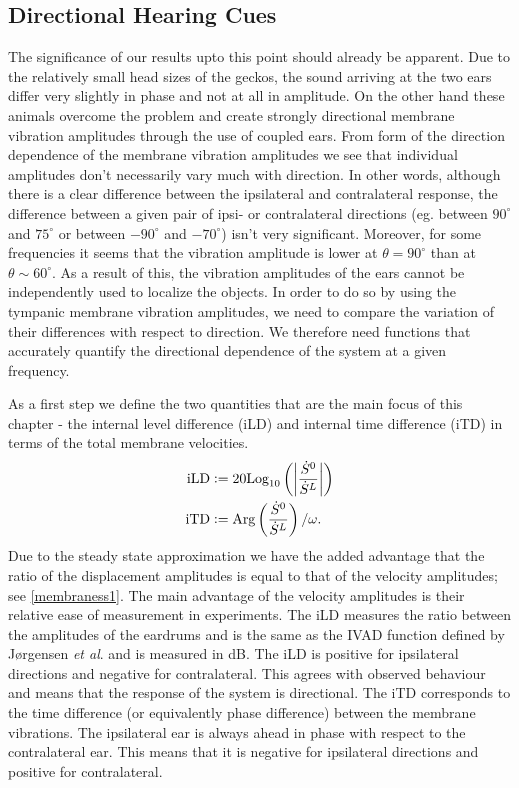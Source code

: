\subsection{Directional Hearing Cues}\label{hearingcuessection}
The significance of our results upto this point should
already be apparent. Due to the relatively small head sizes of the geckos, the sound arriving at the two ears differ very slightly in phase and not at all in amplitude. On the other hand
 these animals overcome the problem and create strongly directional membrane vibration amplitudes through the use of coupled ears. From
 form of the direction dependence of the membrane vibration amplitudes we see that individual amplitudes don't necessarily vary much with direction. In other words, although
 there is a clear difference between the ipsilateral and contralateral response, the difference between a given pair of ipsi- or contralateral directions (eg. between $90^\circ$
 and $75^\circ$ or between $-90^\circ$ and $-70^\circ$) isn't very significant. Moreover, for some frequencies it seems that the vibration amplitude is lower at $\theta=90^\circ$ 
 than at $\theta\sim 60^\circ$.
 As a result of this, the vibration amplitudes of the ears cannot be independently used to localize the objects. In order to do so by using the tympanic membrane 
 vibration amplitudes, we need to compare the variation of their differences with respect to direction.
We therefore need functions that accurately quantify the directional dependence of the system at a given frequency. 

As a first step we define the two quantities that are the main focus of this chapter - the internal level difference (iLD) and internal time difference (iTD)
in terms of the total membrane velocities. 
\begin{align}
  \mbox{iLD}&\vcentcolon= 20\mbox{Log}_{10}\left(\left|\frac{\dot{S}^0}{\dot{S}^L}\right|\right)\label{iLDfirstdef}\\
  \mbox{iTD}&\vcentcolon= \mbox{Arg}\left(\frac{\dot{S}^0}{\dot{S}^L}\right)/\omega.\label{iTDfirstdef}
\end{align}
Due to the steady state approximation we have the added advantage that the ratio of the displacement amplitudes is equal
to that of the velocity amplitudes; see \eqref{membraness1}. The main advantage of the velocity amplitudes 
is their relative ease of measurement in experiments. The iLD measures the ratio between the amplitudes of the eardrums and is the same as the IVAD function defined by J\o{}rgensen \emph{et al}. \cite{jorgensenschmitz} and
is measured in dB. The iLD is positive for ipsilateral directions and negative for contralateral.
This agrees with observed behaviour and means that the response of the system is directional.  The iTD corresponds to the time
difference (or equivalently phase difference) between the membrane vibrations. The ipsilateral ear is always ahead in phase
with respect to the contralateral ear. This means that it is negative for ipsilateral directions and positive for contralateral.

